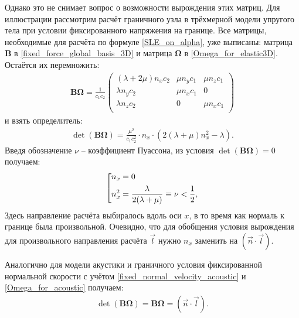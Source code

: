 \documentclass[a4paper]{article}
\numberwithin{equation}{section}
\begin{document}
Однако это не снимает вопрос о возможности вырождения этих матриц. 
Для иллюстрации рассмотрим расчёт граничного узла в трёхмерной 
модели упругого тела при условии фиксированного напряжения на границе. 
Все матрицы, необходимые для расчёта по формуле \ref{SLE_on_alpha}, уже выписаны: 
матрица $\mathbf{B}$ в \ref{fixed_force_global_basis_3D} и 
матрица $\mathbf{\Omega}$ в \ref{Omega_for_elastic3D}. 
Остаётся их перемножить:
\begin{align}
	\mathbf{B} \mathbf{\Omega} = \frac{1}{c_1 c_2}
	\left( \begin{array}{cccccccccccc}
	 (\lambda + 2\mu) n_x c_2 & \mu n_y c_1 & \mu n_z c_1   \\
	 \lambda n_y c_2          & \mu n_x c_1 & 0             \\
	 \lambda n_z c_2          & 0 & \mu n_x c_1             \\
	\end{array} \right)
\end{align}
и взять определитель:
\begin{eqnarray}
	\det (\mathbf{B} \mathbf{\Omega}) = \frac{\mu^{2}}{c_1 c^2_2} \cdot n_x \cdot (2 (\lambda + \mu) n^2_x - \lambda).
\end{eqnarray}
Введя обозначение $\nu$ -- коэффициент Пуассона, из условия 
$\det (\mathbf{B} \mathbf{\Omega}) = 0$ получаем:
\begin{eqnarray}
\left[
\begin{gathered} 
	 n_x = 0  \hfill  \\
	 n^2_x = \frac{\lambda}{2(\lambda + \mu)} \equiv \nu < \frac{1}{2}, \hfill  \\
\end{gathered} 
\right.
\end{eqnarray}
Здесь направление расчёта выбиралось вдоль оси $x$, в то время как нормаль 
к границе была произвольной. Очевидно, что для обобщения условия 
вырождения для произвольного направления расчёта $\vec{l}$ нужно $n_x$ заменить на 
$(\vec{n} \cdot \vec{l})$.

Аналогично для модели акустики и граничного условия фиксированной 
нормальной скорости с учётом \ref{fixed_normal_velocity_acoustic} 
и \ref{Omega_for_acoustic} получаем:
\begin{eqnarray}
\label{BOmega_acoustic}
	\det (\mathbf{B} \mathbf{\Omega}) = \mathbf{B} \mathbf{\Omega} = (\vec{n} \cdot \vec{l}).
\end{eqnarray}
\end{document}
